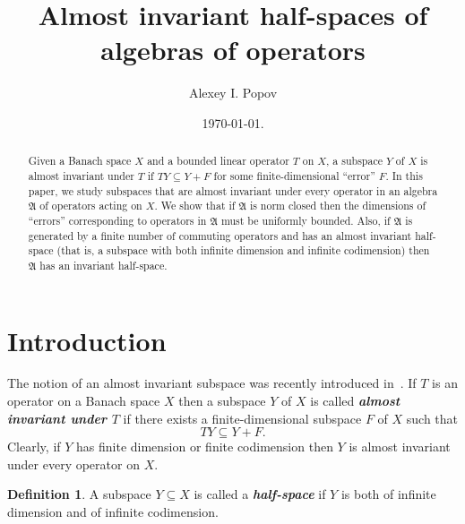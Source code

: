\documentclass[12pt]{amsart}
\theoremstyle{plain}
\theoremstyle{definition}
\newtheorem{definition}[theorem]{Definition}
\theoremstyle{remark}
\begin{document}
\baselineskip 18pt

\title[Almost invariant half-spaces of algebras of operators]
{Almost invariant half-spaces of\\ algebras of operators}

\author[A.I.~Popov]{Alexey I. Popov}
\address{Department of Mathematical and Statistical Sciences, University of Alberta, Edmonton, AB, T6G\,2G1. Canada}

\date{\today.}
\begin{abstract} Given a Banach space $X$ and a bounded linear operator $T$ on $X$, a subspace $Y$ of $X$ is almost invariant under $T$ if $TY\subseteq Y+F$ for some finite-dimensional ``error'' $F$. In this paper, we study subspaces that are almost invariant under every operator in an algebra $\mathfrak A$ of operators acting on $X$. We show that if $\mathfrak A$ is norm closed then the dimensions of ``errors'' corresponding to operators in $\mathfrak A$ must be uniformly bounded. Also, if $\mathfrak A$ is generated by a finite number of commuting operators and has an almost invariant half-space (that is, a subspace with both infinite dimension and infinite codimension) then $\mathfrak A$ has an invariant half-space.
\end{abstract}

\maketitle

\section{Introduction}

The notion of an almost invariant subspace was recently introduced in~\cite{APTT}. If $T$ is an operator on a Banach space $X$ then a subspace $Y$ of $X$ is called {{\textit{\textbf{{almost invariant under $T$}}}}} if there exists a finite-dimensional subspace $F$ of $X$ such that 
\begin{equation}\label{Y+F}
TY\subseteq Y+F.
\end{equation}
Clearly, if $Y$ has finite dimension or finite codimension then $Y$ is almost invariant under every operator on $X$.

\begin{definition}\cite{APTT} A subspace $Y\subseteq X$ is called a {{\textit{\textbf{{half-space}}}}} if $Y$ is both of infinite dimension and of infinite codimension.
\end{definition}
\end{document}
